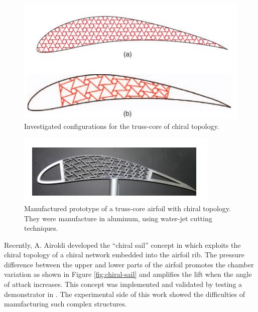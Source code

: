   \begin{figure}[!htpb]
    \centering
    \includegraphics[width=0.7 \textwidth]{figures/state-of-the-art/truss-core-airfoils}
    \caption[Investigated configurations for the truss-core of chiral topology]{Investigated configurations for the truss-core of chiral topology. \cite{Spadoni2007a}}\label{fig:truss-core-airfoil}
  \end{figure}

  \begin{figure}[!htpb]
    \centering
    \includegraphics[width=0.8 \textwidth]{figures/state-of-the-art/truss-core-prototype}
    \caption[Manufactured prototype of a truss-core airfoil with chiral topology]{Manufactured prototype of a truss-core airfoil with chiral topology. They were manufacture in aluminum, using water-jet cutting techniques. \cite{Spadoni2007b}}\label{fig:truss-core-prototype}
  \end{figure}

  Recently, A. Airoldi developed the ``chiral sail'' concept in \cite{Airoldi2012} which exploits the chiral topology of a chiral network embedded into the airfoil rib. The pressure difference between the upper and lower parts of the airfoil promotes the chamber variation as shown in Figure \ref{fig:chiral-sail} and amplifies the lift when the angle of attack increases. This concept was implemented and validated by testing a demonstrator in \cite{Airoldi2015a}. The experimental side of this work showed the difficulties of manufacturing such complex structures.

